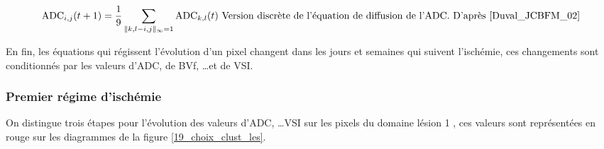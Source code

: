 \begin{equation}
\text{ADC}_{i,j}(t+1)=\frac{1}{9}\sum\limits_{\|k,l-i,j\|_{\infty}=1}\text{ADC}_{k,l}(t)%
\text{ Version discr\g{e}te de l'\'equation de diffusion de l'ADC. D'apr\g{e}s \cite{Duval_JCBFM_02}}
\end{equation}


\par
En fin, les \'equations qui r\'egissent l'\'evolution d'un pixel changent dans les jours et semaines qui suivent l'isch\'emie, %
ces changements sont conditionn\'es par les valeurs d'ADC, de BVf, \dots et de VSI.

\subsubsection{Premier r\'egime d'isch\'emie}

On distingue trois \'etapes pour l'\'evolution des valeurs d'ADC, \dots VSI sur les pixels du domaine \og{} l\'esion 1 \fg{}, %
ces valeurs sont repr\'esent\'ees en rouge sur les diagrammes de la figure \ref{19_choix_clust_les}.

